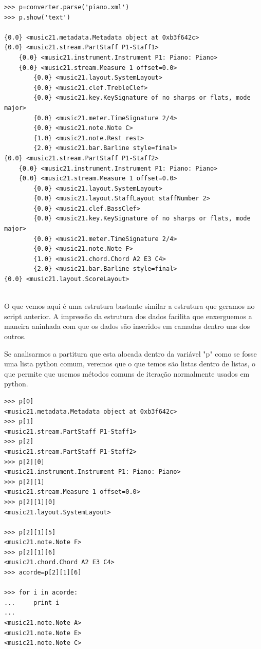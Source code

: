 \documentclass[
	12pt,				%
	openright,			%
	twoside,			%
	a4paper,			%
	english,			%
	french,				%
	spanish,			%
	brazil				%
	]{abntex2}
\begin{document}
\begin{lstlisting}
>>> p=converter.parse('piano.xml')
>>> p.show('text')

{0.0} <music21.metadata.Metadata object at 0xb3f642c>
{0.0} <music21.stream.PartStaff P1-Staff1>
    {0.0} <music21.instrument.Instrument P1: Piano: Piano>
    {0.0} <music21.stream.Measure 1 offset=0.0>
        {0.0} <music21.layout.SystemLayout>
        {0.0} <music21.clef.TrebleClef>
        {0.0} <music21.key.KeySignature of no sharps or flats, mode major>
        {0.0} <music21.meter.TimeSignature 2/4>
        {0.0} <music21.note.Note C>
        {1.0} <music21.note.Rest rest>
        {2.0} <music21.bar.Barline style=final>
{0.0} <music21.stream.PartStaff P1-Staff2>
    {0.0} <music21.instrument.Instrument P1: Piano: Piano>
    {0.0} <music21.stream.Measure 1 offset=0.0>
        {0.0} <music21.layout.SystemLayout>
        {0.0} <music21.layout.StaffLayout staffNumber 2>
        {0.0} <music21.clef.BassClef>
        {0.0} <music21.key.KeySignature of no sharps or flats, mode major>
        {0.0} <music21.meter.TimeSignature 2/4>
        {0.0} <music21.note.Note F>
        {1.0} <music21.chord.Chord A2 E3 C4>
        {2.0} <music21.bar.Barline style=final>
{0.0} <music21.layout.ScoreLayout>


\end{lstlisting}

O que vemos aqui é uma estrutura bastante similar a estrutura que geramos no script anterior. A impressão da estrutura dos dados facilita que enxerguemos a maneira aninhada com que os dados são inseridos em camadas dentro uns dos outros.

Se analisarmos a partitura que esta alocada dentro da variável "p" como se fosse uma lista python comum, veremos que o que temos são listas dentro de listas, o que permite que usemos métodos comuns de iteração normalmente usados em python.

\begin{lstlisting}
>>> p[0]
<music21.metadata.Metadata object at 0xb3f642c>
>>> p[1]
<music21.stream.PartStaff P1-Staff1>
>>> p[2]
<music21.stream.PartStaff P1-Staff2>
>>> p[2][0]
<music21.instrument.Instrument P1: Piano: Piano>
>>> p[2][1]
<music21.stream.Measure 1 offset=0.0>
>>> p[2][1][0]
<music21.layout.SystemLayout>

>>> p[2][1][5]
<music21.note.Note F>
>>> p[2][1][6]
<music21.chord.Chord A2 E3 C4>
>>> acorde=p[2][1][6]

>>> for i in acorde:
...     print i
... 
<music21.note.Note A>
<music21.note.Note E>
<music21.note.Note C>

\end{lstlisting}
\end{document}
